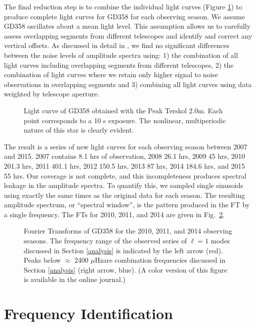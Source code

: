 \documentclass[12pt,preprint]{aastex}
\newcommand{\muHz}{\mbox{$\mu$Hz}}
\begin{document}
The final reduction step is to combine the individual light curves (Figure \ref{tersk}) to produce 
complete light curves for GD358 for each observing season. We assume GD358 oscillates about 
a mean light level. This assumption allows us to carefully assess overlapping segments from 
different telescopes and identify and correct any vertical offsets. As discussed in detail 
in \citet{Provencal09}, we find no significant differences between the noise levels of 
amplitude spectra using: 1) the combination of all light curves including overlapping 
segments from different telescopes, 2) the combination of light curves where we retain 
only higher signal to noise observations in overlapping segments and 3) combining all light 
curves using data weighted by telescope aperture.

\begin{figure}
\caption{Light curve of GD358 obtained with the Peak Terskol 2.0m.  Each point corresponds 
to a 10 s exposure. The nonlinear, multiperiodic nature of this star is clearly evident.
\label{tersk}
}
\end{figure}

The result is a series of new light curves for each observing season between 2007 and 2015. 
2007 contains 8.1 hrs of observation, 2008 26.1 hrs, 2009 45 hrs, 2010 201.3 hrs, 2011 
401.1 hrs, 2012 150.5 hrs, 2013 87 hrs, 2014 184.6 hrs, and 2015 55 hrs. Our coverage is 
not complete, and this incompleteness produces spectral leakage in the amplitude spectra. 
To quantify this, we sampled single sinusoids using exactly the same times as the original 
data for each season. The resulting amplitude spectrum, or ``spectral window'', is the 
pattern produced in the FT by a single frequency. The FTs for 2010, 2011, and 2014 
are given in Fig.~\ref{fts}.


\begin{figure}
\caption{Fourier Transforms of GD358 for the 2010, 2011, and 2014 observing seasons.
The frequency range of the observed series of $\ell=1$ modes discussed in Section \ref{analysis} 
is indicated by the left arrow (red).  Peaks below $\approx$ 2400 \muHz are combination 
frequencies discussed in Section \ref{analysis} (right arrow, blue). 
(A color version of this figure is available in the online journal.)
\label{fts}
}
\end{figure}

\section{Frequency Identification}\label{freq}
 
\end{document}
